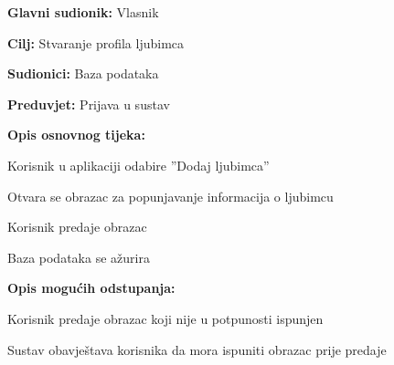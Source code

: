 				\noindent {}
				\begin{packed_item}
					
					\item \textbf{Glavni sudionik: } Vlasnik
					\item  \textbf{Cilj:} Stvaranje profila ljubimca
					\item  \textbf{Sudionici:} Baza podataka
					\item  \textbf{Preduvjet:} Prijava u sustav
					\item  \textbf{Opis osnovnog tijeka:}
					
					\item[] \begin{packed_enum}
						
						\item Korisnik u aplikaciji odabire ”Dodaj ljubimca”
						\item Otvara se obrazac za popunjavanje informacija o ljubimcu
						\item Korisnik predaje obrazac
						\item Baza podataka se ažurira
						
					\end{packed_enum}
					
					\item  \textbf{Opis mogućih odstupanja:}
					
					\item[] \begin{packed_item}
						
						\item[3.a] Korisnik predaje obrazac koji nije u potpunosti ispunjen
						\item[] \begin{packed_enum}
							
							\item Sustav obavještava korisnika da mora ispuniti obrazac prije predaje
							
						\end{packed_enum}					
					\end{packed_item}
				\end{packed_item}
				

